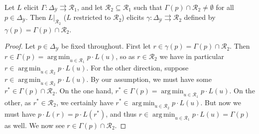 \documentclass[anon,12pt]{colt2019}
\newcommand{\simplex}{\Delta_\Y}
\newcommand{\R}{\mathcal{R}}
\newcommand{\Y}{\mathcal{Y}}
\newcommand{\toto}{\rightrightarrows}
\DeclareMathOperator*{\argmin}{arg\,min}
\begin{document}
\begin{lemma}\label{lem:loss-restrict}
  Let $L$ elicit $\Gamma:\simplex\toto\R_1$, and let $\R_2\subseteq\R_1$ such that $\Gamma(p) \cap \R_2 \neq \emptyset$ for all $p\in\simplex$.
  Then $L|_{\R_2}$ ($L$ restricted to $\R_2$) elicits $\gamma:\simplex\toto\R_2$ defined by $\gamma(p) = \Gamma(p)\cap \R_2$.
\end{lemma}
\begin{proof}
  Let $p\in\simplex$ be fixed throughout.
  First let $r \in \gamma(p) = \Gamma(p) \cap \R_2$.
  Then $r \in \Gamma(p) = \argmin_{u\in\R_1} p\cdot L(u)$, so as $r\in\R_2$ we have in particular $r \in \argmin_{u\in\R_2} p\cdot L(u)$.
  For the other direction, suppose $r \in \argmin_{u\in\R_2} p\cdot L(u)$.
  By our assumption, we must have some $r^* \in \Gamma(p) \cap \R_2$.
  On the one hand, $r^*\in\Gamma(p) = \argmin_{u\in\R_1} p\cdot L(u)$.
  On the other, as $r^* \in \R_2$, we certainly have $r^* \in \argmin_{u\in\R_2} p\cdot L(u)$.
  But now we must have $p\cdot L(r) = p\cdot L(r^*)$, and thus $r \in \argmin_{u\in\R_1} p\cdot L(u) = \Gamma(p)$ as well.
  We now see $r \in \Gamma(p) \cap \R_2$.
\end{proof}
\end{document}
